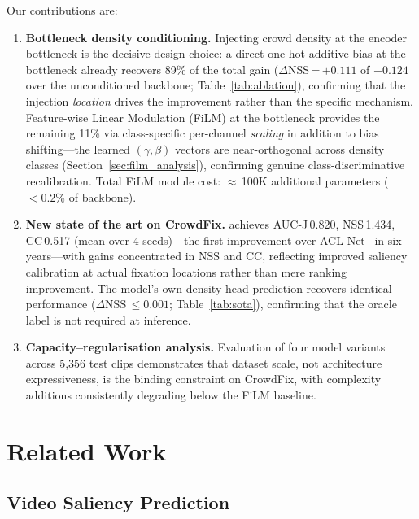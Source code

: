 \documentclass[twocolumn]{article}
\begin{document}
Our contributions are:
\begin{enumerate}
  \item \textbf{Bottleneck density conditioning.}  Injecting crowd density
        at the encoder bottleneck is the decisive design choice: a direct
        one-hot additive bias at the bottleneck already recovers 89\% of
        the total gain ($\Delta$NSS\,=\,$+0.111$ of $+0.124$ over the
        unconditioned backbone; Table~\ref{tab:ablation}), confirming that
        the injection \emph{location} drives the improvement rather than the
        specific mechanism.  Feature-wise Linear Modulation (FiLM) at the
        bottleneck provides the remaining 11\% via class-specific per-channel
        \emph{scaling} in addition to bias shifting---the learned
        $(\gamma,\beta)$ vectors are near-orthogonal across density classes
        (Section~\ref{sec:film_analysis}), confirming genuine
        class-discriminative recalibration.  Total FiLM module cost:
        $\approx$\,100K additional parameters ($<\!0.2$\% of backbone).
  \item \textbf{New state of the art on CrowdFix.}  \ourmodel{} achieves
        AUC-J\,0.820, NSS\,1.434, CC\,0.517 (mean over 4 seeds)---the first improvement over
        ACL-Net~\citep{aclnet} in six years---with gains concentrated in
        NSS and CC, reflecting improved saliency calibration at actual
        fixation locations rather than mere ranking improvement.
        The model's own density head prediction recovers identical performance
        ($\Delta$NSS\,$\leq\!0.001$; Table~\ref{tab:sota}), confirming that
        the oracle label is not required at inference.
  \item \textbf{Capacity--regularisation analysis.}  Evaluation of four
        model variants across 5,356 test clips demonstrates that dataset
        scale, not architecture expressiveness, is the binding constraint on
        CrowdFix, with complexity additions consistently degrading
        below the FiLM baseline.
\end{enumerate}

\section{Related Work}
\label{sec:related}

\subsection{Video Saliency Prediction}
\end{document}
